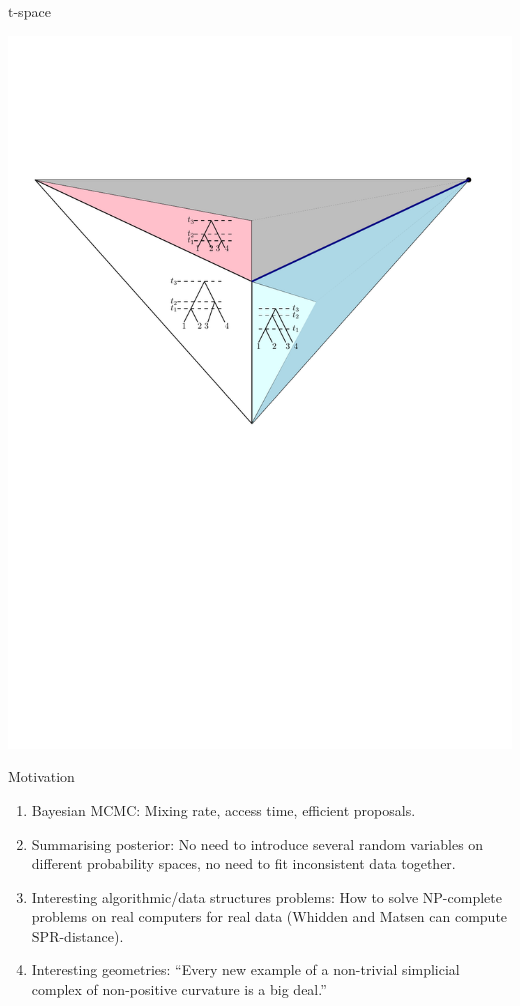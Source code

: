 \documentclass{beamer}
\renewcommand{\t}{$\mathrm{t}$}
\newcommand{\MCMC}{$\mathrm{MCMC}$}
\newcommand{\SPR}{$\mathrm{SPR}$}
\begin{document}
\begin{frame}{\t-space}
\begin{definition}
\includegraphics[width=\framewidth]{tSpace}
\end{definition}
\end{frame}

\begin{frame}{Motivation}
\begin{block}

\begin{enumerate}
\item Bayesian \MCMC: Mixing rate, access time, efficient proposals. 
\item Summarising posterior: No need to introduce several random variables on different probability spaces, no need to fit inconsistent data together. 
\item Interesting algorithmic/data structures problems: How to solve NP-complete problems on real computers for real data (Whidden and Matsen can compute \SPR-distance).
\item Interesting geometries: ``Every new example of a non-trivial simplicial complex of non-positive curvature is a big deal.''
\end{enumerate}
\end{block}
\end{frame}
\end{document}
